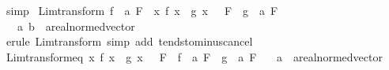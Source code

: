 \begin{isabellebody}
\ simp%
\endisatagproof
{\isafoldproof}%
%
\isadelimproof
\isanewline
%
\endisadelimproof
\isanewline
{}\isamarkupfalse%
\ Lim{\isacharunderscore}{\kern0pt}transform{}{\isacharcolon}{\kern0pt}\ {\isachardoublequoteopen}{\isacharparenleft}{\kern0pt}f\ {\isasymlonglongrightarrow}\ a{\isacharparenright}{\kern0pt}\ F\ {\isasymLongrightarrow}\ {\isacharparenleft}{\kern0pt}{\isacharparenleft}{\kern0pt}{\isasymlambda}x{\isachardot}{\kern0pt}\ f\ x\ {\isacharminus}{\kern0pt}\ g\ x{\isacharparenright}{\kern0pt}\ {\isasymlonglongrightarrow}\ {}{\isacharparenright}{\kern0pt}\ F\ {\isasymLongrightarrow}\ {\isacharparenleft}{\kern0pt}g\ {\isasymlonglongrightarrow}\ a{\isacharparenright}{\kern0pt}\ F{\isachardoublequoteclose}\isanewline
\ \ \ a\ b\ {\isacharcolon}{\kern0pt}{\isacharcolon}{\kern0pt}\ {\isachardoublequoteopen}{\isacharprime}{\kern0pt}a{\isacharcolon}{\kern0pt}{\isacharcolon}{\kern0pt}real{\isacharunderscore}{\kern0pt}normed{\isacharunderscore}{\kern0pt}vector{\isachardoublequoteclose}\isanewline
%
\isadelimproof
\ \ %
\endisadelimproof
%
\isatagproof
{}\isamarkupfalse%
\ {\isacharparenleft}{\kern0pt}erule\ Lim{\isacharunderscore}{\kern0pt}transform{\isacharparenright}{\kern0pt}\ {\isacharparenleft}{\kern0pt}simp\ add{\isacharcolon}{\kern0pt}\ tendsto{\isacharunderscore}{\kern0pt}minus{\isacharunderscore}{\kern0pt}cancel{\isacharparenright}{\kern0pt}%
\endisatagproof
{\isafoldproof}%
%
\isadelimproof
\isanewline
%
\endisadelimproof
\isanewline
{}\isamarkupfalse%
\ Lim{\isacharunderscore}{\kern0pt}transform{\isacharunderscore}{\kern0pt}eq{\isacharcolon}{\kern0pt}\ {\isachardoublequoteopen}{\isacharparenleft}{\kern0pt}{\isacharparenleft}{\kern0pt}{\isasymlambda}x{\isachardot}{\kern0pt}\ f\ x\ {\isacharminus}{\kern0pt}\ g\ x{\isacharparenright}{\kern0pt}\ {\isasymlonglongrightarrow}\ {}{\isacharparenright}{\kern0pt}\ F\ {\isasymLongrightarrow}\ {\isacharparenleft}{\kern0pt}f\ {\isasymlonglongrightarrow}\ a{\isacharparenright}{\kern0pt}\ F\ {\isasymlongleftrightarrow}\ {\isacharparenleft}{\kern0pt}g\ {\isasymlonglongrightarrow}\ a{\isacharparenright}{\kern0pt}\ F{\isachardoublequoteclose}\isanewline
\ \ \ a\ {\isacharcolon}{\kern0pt}{\isacharcolon}{\kern0pt}\ {\isachardoublequoteopen}{\isacharprime}{\kern0pt}a{\isacharcolon}{\kern0pt}{\isacharcolon}{\kern0pt}real{\isacharunderscore}{\kern0pt}normed{\isacharunderscore}{\kern0pt}vector{\isachardoublequoteclose}\isanewline
%
\isadelimproof
\ \ %
\endisadelimproof
%
\isatagproof
{}\isamarkupfalse%

\end{isabellebody}
